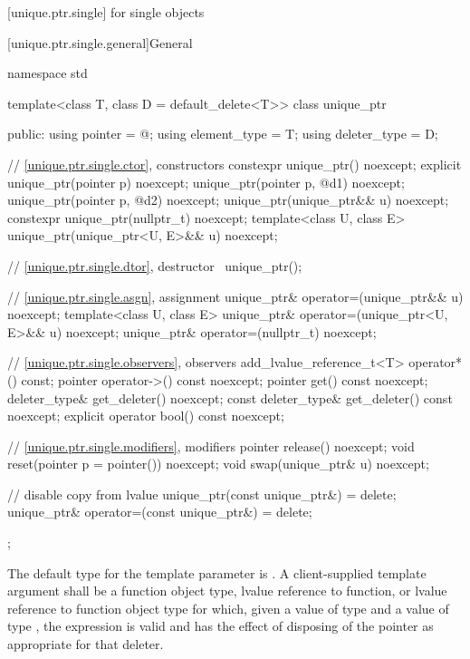 [unique.ptr.single]{ for single objects}

[unique.ptr.single.general]{General}

%
\begin{codeblock}
namespace std {
  template<class T, class D = default_delete<T>> class unique_ptr {
  public:
    using pointer      = @\seebelow@;
    using element_type = T;
    using deleter_type = D;

    // \ref{unique.ptr.single.ctor}, constructors
    constexpr unique_ptr() noexcept;
    explicit unique_ptr(pointer p) noexcept;
    unique_ptr(pointer p, @\seebelow@ d1) noexcept;
    unique_ptr(pointer p, @\seebelow@ d2) noexcept;
    unique_ptr(unique_ptr&& u) noexcept;
    constexpr unique_ptr(nullptr_t) noexcept;
    template<class U, class E>
      unique_ptr(unique_ptr<U, E>&& u) noexcept;

    // \ref{unique.ptr.single.dtor}, destructor
    ~unique_ptr();

    // \ref{unique.ptr.single.asgn}, assignment
    unique_ptr& operator=(unique_ptr&& u) noexcept;
    template<class U, class E>
      unique_ptr& operator=(unique_ptr<U, E>&& u) noexcept;
    unique_ptr& operator=(nullptr_t) noexcept;

    // \ref{unique.ptr.single.observers}, observers
    add_lvalue_reference_t<T> operator*() const;
    pointer operator->() const noexcept;
    pointer get() const noexcept;
    deleter_type& get_deleter() noexcept;
    const deleter_type& get_deleter() const noexcept;
    explicit operator bool() const noexcept;

    // \ref{unique.ptr.single.modifiers}, modifiers
    pointer release() noexcept;
    void reset(pointer p = pointer()) noexcept;
    void swap(unique_ptr& u) noexcept;

    // disable copy from lvalue
    unique_ptr(const unique_ptr&) = delete;
    unique_ptr& operator=(const unique_ptr&) = delete;
  };
}
\end{codeblock}

\pnum
The default type for the template parameter  is
. A client-supplied template argument
 shall be a function
object type, lvalue reference to function, or
lvalue reference to function object type
for which, given
a value  of type  and a value
 of type , the expression
 is valid and has the effect of disposing of the
pointer as appropriate for that deleter.

